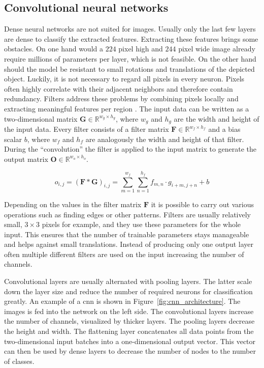 \subsection{Convolutional neural networks}
Dense neural networks are not suited for images. Usually only the last few layers are dense to classify the extracted features. Extracting these features brings some obstacles. On one hand would a $224$ pixel high and $244$ pixel wide image already require millions of parameters per layer, which is not feasible. On the other hand should the model be resistant to small rotations and translations of the depicted object. Luckily, it is not necessary to regard all pixels in every neuron. Pixels often highly correlate with their adjacent neighbors and therefore contain redundancy.
Filters address these problems by combining pixels locally and extracting meaningful features per region \autocite{lecun1989}. The input data can be written as a two-dimensional matrix $\mathbf{G} \in \mathbb{R}^{w_g \times h_g}$, where $w_g$ and $h_g$ are the width and height of the input data. Every filter consists of a filter matrix $\mathbf{F} \in \mathbb{R}^{w_f \times h_f}$ and a bias scalar $b$, where $w_f$ and $h_f$ are analogously the width and height of that filter. During the ``convolution'' the filter is applied to the input matrix to generate the output matrix $\mathbf{O} \in \mathbb{R}^{w_o \times h_o}$.

\begin{equation}
o_{i,j} = (\mathbf{F} \ast \mathbf{G})_{i,j} = \sum_{m=1}^{w_f}\sum_{n=1}^{h_f} f_{m,n} \cdot g_{i+m, j+n} + b
\end{equation}

Depending on the values in the filter matrix $\mathbf{F}$ it is possible to carry out various operations such as finding edges or other patterns. 
Filters are usually relatively small, $3 \times 3$ pixels for example, and they use these parameters for the whole input. This ensures that the number of trainable parameters stays manageable and helps against small translations. 
Instead of producing only one output layer often multiple different filters are used on the input increasing the number of channels. 

Convolutional layers are usually alternated with pooling layers. The latter scale down the layer size and reduce the number of required neurons for classification greatly. An example of a \gls{cnn} is shown in Figure~\ref{fig:cnn_architecture}. The images is fed into the network on the left side. The convolutional layers increase the number of channels, visualized by thicker layers. The pooling layers decrease the height and width. The flattening layer concatenates all data points from the two-dimensional input batches into a one-dimensional output vector. This vector can then be used by dense layers to decrease the number of nodes to the number of classes.

